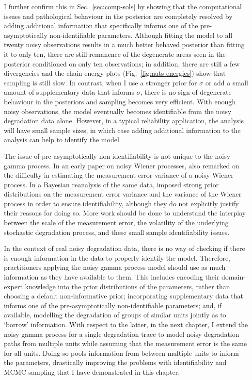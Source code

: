 I further confirm this in Sec.~\ref{sec:comp-sols} by showing that the computational issues and pathological behaviour in the posterior are completely resolved by adding additional information that specifically informs one of the pre-asymptotically non-identifiable parameters. Although fitting the model to all twenty noisy observations results in a much better behaved posterior than fitting it to only ten, there are still remanence of the degenerate areas seen in the posterior conditioned on only ten observations; in addition, there are still a few divergencies and the chain energy plots (Fig.~\ref{fig:nuts-energies}) show that sampling is still slow. In contrast, when I use a stronger prior for $\sigma$ or add a small amount of supplementary data that informs $\sigma$, there is no sign of degenerate behaviour in the posteriors and sampling becomes very efficient. With enough noisy observations, the model eventually becomes identifiable from the noisy degradation data alone. However, in a typical reliability application, the analysis will have small sample sizes, in which case adding additional information to the analysis can help to identify the model.

The issue of pre-asymptotically non-identifiability is not unique to the noisy gamma process. In an early paper on noisy Wiener processes, \citet{whitmore_1995} also remarked on the difficulty in estimating the measurement error variance of a noisy Wiener process. In a Bayesian reanalysis of the same data, \citet{hamada_2008} imposed strong prior distributions on the measurement error variance and the variance of the Wiener process in order to ensure identifiability, although they do not explicitly justify their reasons for doing so. More work should be done to understand the interplay between the scale of the measurement error, the volatility of the underlying stochastic degradation process, and these small sample identifiability issues.

In the context of real noisy degradation data, there is no way of checking if there is enough information in the data to properly identify the model. Therefore, practitioners applying the noisy gamma process model should use as much information as they have available to them. This includes encoding their domain-expert knowledge into the prior distributions of the parameters, rather than choosing a default non-informative prior; incorporating supplementary data that informs one of the pre-asymptotically non-identifiable parameters; and, if available, modelling the degradation of groups of similar units jointly as to `borrow' information. With respect to the latter, in the next chapter, I extend the noisy gamma process for a single degradation trace to model noisy degradation paths from multiple units while assuming that the measurement error is the same for all units. Doing so pools information from between multiple units to inform the parameters, drastically improving the problems with identifiability and MCMC sampling that I have demonstrated in this chapter.
